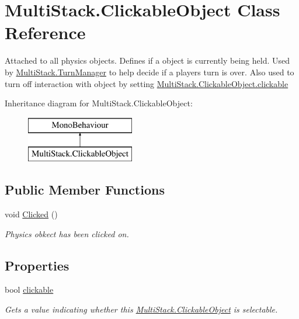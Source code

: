 \hypertarget{class_multi_stack_1_1_clickable_object}{}\section{Multi\+Stack.\+Clickable\+Object Class Reference}
\label{class_multi_stack_1_1_clickable_object}


Attached to all physics objects. Defines if a object is currently being held. Used by \hyperlink{class_multi_stack_1_1_turn_manager}{Multi\+Stack.\+Turn\+Manager} to help decide if a players turn is over. Also used to turn off interaction with object by setting \hyperlink{class_multi_stack_1_1_clickable_object_a9fbbe82e73f95769344946b8b39e2520}{Multi\+Stack.\+Clickable\+Object.\+clickable}  


Inheritance diagram for Multi\+Stack.\+Clickable\+Object\+:\begin{figure}[H]
\begin{center}
\leavevmode
\includegraphics[height=2.000000cm]{class_multi_stack_1_1_clickable_object}
\end{center}
\end{figure}
\subsection*{Public Member Functions}
\begin{DoxyCompactItemize}
\item 
void \hyperlink{class_multi_stack_1_1_clickable_object_ae6b5da3e366e61daac3031b9643a780e}{Clicked} ()
\begin{DoxyCompactList}\small\item\em Physics obkect has been \textquotesingle{}clicked\textquotesingle{} on. \end{DoxyCompactList}\end{DoxyCompactItemize}
\subsection*{Properties}
\begin{DoxyCompactItemize}
\item 
bool \hyperlink{class_multi_stack_1_1_clickable_object_a9fbbe82e73f95769344946b8b39e2520}{clickable}
\begin{DoxyCompactList}\small\item\em Gets a value indicating whether this \hyperlink{class_multi_stack_1_1_clickable_object}{Multi\+Stack.\+Clickable\+Object} is selectable. \end{DoxyCompactList}\end{DoxyCompactItemize}



